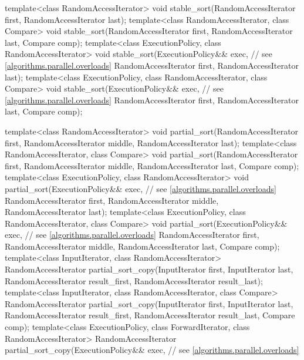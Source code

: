 \begin{codeblock}
{  template<class RandomAccessIterator>
    void stable_sort(RandomAccessIterator first, RandomAccessIterator last);
  template<class RandomAccessIterator, class Compare>
    void stable_sort(RandomAccessIterator first, RandomAccessIterator last,
                     Compare comp);
  template<class ExecutionPolicy, class RandomAccessIterator>
    void stable_sort(ExecutionPolicy&& exec, // see \ref{algorithms.parallel.overloads}
                     RandomAccessIterator first, RandomAccessIterator last);
  template<class ExecutionPolicy, class RandomAccessIterator, class Compare>
    void stable_sort(ExecutionPolicy&& exec, // see \ref{algorithms.parallel.overloads}
                     RandomAccessIterator first, RandomAccessIterator last,
                     Compare comp);

  template<class RandomAccessIterator>
    void partial_sort(RandomAccessIterator first,
                      RandomAccessIterator middle,
                      RandomAccessIterator last);
  template<class RandomAccessIterator, class Compare>
    void partial_sort(RandomAccessIterator first,
                      RandomAccessIterator middle,
                      RandomAccessIterator last, Compare comp);
  template<class ExecutionPolicy, class RandomAccessIterator>
    void partial_sort(ExecutionPolicy&& exec, // see \ref{algorithms.parallel.overloads}
                      RandomAccessIterator first,
                      RandomAccessIterator middle,
                      RandomAccessIterator last);
  template<class ExecutionPolicy, class RandomAccessIterator, class Compare>
    void partial_sort(ExecutionPolicy&& exec, // see \ref{algorithms.parallel.overloads}
                      RandomAccessIterator first,
                      RandomAccessIterator middle,
                      RandomAccessIterator last, Compare comp);
  template<class InputIterator, class RandomAccessIterator>
    RandomAccessIterator
      partial_sort_copy(InputIterator first, InputIterator last,
                        RandomAccessIterator result_first,
                        RandomAccessIterator result_last);
  template<class InputIterator, class RandomAccessIterator, class Compare>
    RandomAccessIterator
      partial_sort_copy(InputIterator first, InputIterator last,
                        RandomAccessIterator result_first,
                        RandomAccessIterator result_last,
                        Compare comp);
  template<class ExecutionPolicy, class ForwardIterator, class RandomAccessIterator>
    RandomAccessIterator
      partial_sort_copy(ExecutionPolicy&& exec,  // see \ref{algorithms.parallel.overloads}
}
\end{codeblock}

